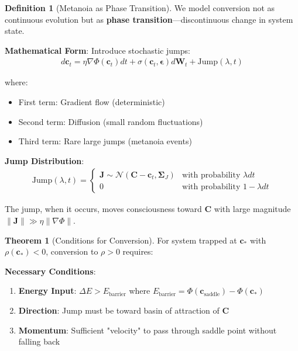 \documentclass[11pt,a4paper]{article}
\theoremstyle{definition}
\newtheorem{definition}{Definition}[section]
\newtheorem{theorem}{Theorem}[section]
\theoremstyle{remark}
\newcommand{\cc}{\mathbf{c}}
\begin{document}
\begin{small}
\begin{enumerate}
\begin{definition}[Metanoia as Phase Transition]
We model conversion not as continuous evolution but as \textbf{phase transition}—discontinuous change in system state.

\textbf{Mathematical Form}: Introduce stochastic jumps:
\begin{align}
d\cc_t = \eta \nabla \Phi(\cc_t) dt + \sigma(\cc_t, \boldsymbol{\epsilon}) d\mathbf{W}_t + \text{Jump}(\lambda, t)
\end{align}

where:
\begin{itemize}
    \item First term: Gradient flow (deterministic)
    \item Second term: Diffusion (small random fluctuations)
    \item Third term: Rare large jumps (metanoia events)
\end{itemize}

\textbf{Jump Distribution}:
\begin{align}
\text{Jump}(\lambda, t) = \begin{cases}
    \mathbf{J} \sim \mathcal{N}(\mathbf{C} - \cc_t, \boldsymbol{\Sigma}_J) & \text{with probability } \lambda dt \\
    0 & \text{with probability } 1 - \lambda dt
\end{cases}
\end{align}

The jump, when it occurs, moves consciousness toward \(\mathbf{C}\) with large magnitude \(\|\mathbf{J}\| \gg \eta \|\nabla \Phi\|\).
\end{definition}

\begin{theorem}[Conditions for Conversion]
For system trapped at \(\cc_*\) with \(\rho(\cc_*) < 0\), conversion to \(\rho > 0\) requires:

\textbf{Necessary Conditions}:
\begin{enumerate}
    \item \textbf{Energy Input}: \(\Delta E > E_{\text{barrier}}\) where \(E_{\text{barrier}} = \Phi(\cc_{\text{saddle}}) - \Phi(\cc_*)\)
    \item \textbf{Direction}: Jump must be toward basin of attraction of \(\mathbf{C}\)
    \item \textbf{Momentum}: Sufficient "velocity" to pass through saddle point without falling back
\end{enumerate}


\end{theorem}
\end{enumerate}
\end{small}
\end{document}
